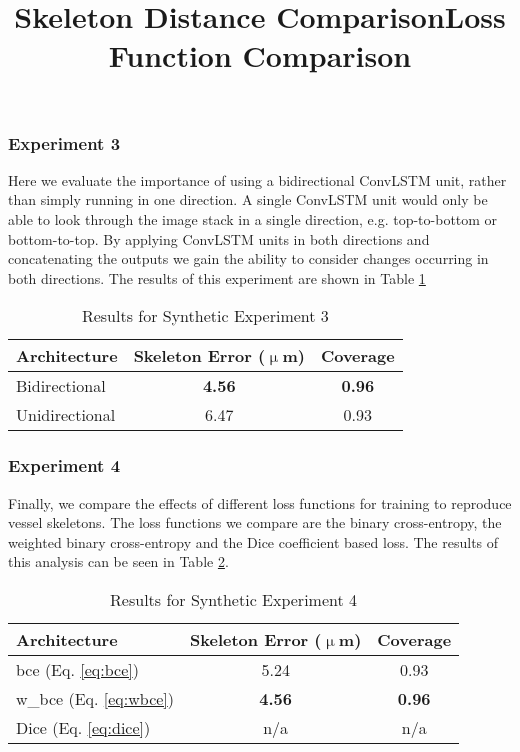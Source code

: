 \documentclass[journal,transmag]{IEEEtran}
\begin{document}
\subsubsection*{Experiment 3}
Here we evaluate the importance of using a bidirectional ConvLSTM unit, rather than simply running in one direction. A single ConvLSTM unit would only be able to look through the image stack in a single direction, e.g. top-to-bottom or bottom-to-top. By applying ConvLSTM units in both directions and concatenating the outputs we gain the ability to consider changes occurring in both directions. The results of this experiment are shown in Table \ref{tab:bidirectional}

\begin{table}[h]
\title{Skeleton Distance Comparison}
\centering
\begin{tabular}{l|c|c}
Architecture & Skeleton Error ($\upmu$m)  & Coverage\\ 
\hline
Bidirectional & \textbf{4.56} & \textbf{0.96}  \\
Unidirectional & 6.47  & 0.93  \\
\end{tabular}
\caption{Results for Synthetic Experiment 3}
\label{tab:bidirectional}
\end{table}


\subsubsection*{Experiment 4}
Finally, we compare the effects of different loss functions for training to reproduce vessel skeletons. The loss functions we compare are the binary cross-entropy, the weighted binary cross-entropy and the Dice coefficient based loss. The results of this analysis can be seen in Table \ref{tab:loss_func}.
\begin{table}[h]
\title{Loss Function Comparison}
\centering
\begin{tabular}{l|c|c}
Architecture & Skeleton Error ($\upmu$m)  & Coverage \\ 
\hline
bce (Eq. \ref{eq:bce}) & 5.24 & 0.93 \\
w\_bce (Eq. \ref{eq:wbce}) & \textbf{4.56}  & \textbf{0.96} \\
Dice (Eq. \ref{eq:dice}) & n/a  & n/a \\
\end{tabular}
\caption{Results for Synthetic Experiment 4}
\label{tab:loss_func}
\end{table}
\end{document}
